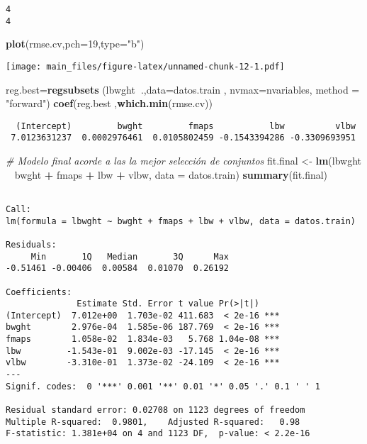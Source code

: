 \documentclass[]{article}
\newenvironment{Shaded}{\begin{snugshade}}{\end{snugshade}}
\newcommand{\KeywordTok}[1]{\textcolor[rgb]{0.13,0.29,0.53}{\textbf{#1}}}
\newcommand{\DataTypeTok}[1]{\textcolor[rgb]{0.13,0.29,0.53}{#1}}
\newcommand{\DecValTok}[1]{\textcolor[rgb]{0.00,0.00,0.81}{#1}}
\newcommand{\StringTok}[1]{\textcolor[rgb]{0.31,0.60,0.02}{#1}}
\newcommand{\CommentTok}[1]{\textcolor[rgb]{0.56,0.35,0.01}{\textit{#1}}}
\newcommand{\OperatorTok}[1]{\textcolor[rgb]{0.81,0.36,0.00}{\textbf{#1}}}
\newcommand{\NormalTok}[1]{#1}
\begin{document}
\begin{verbatim}
4 
4 
\end{verbatim}

\begin{Shaded}
\begin{Highlighting}[]
\KeywordTok{plot}\NormalTok{(rmse.cv,}\DataTypeTok{pch=}\DecValTok{19}\NormalTok{,}\DataTypeTok{type=}\StringTok{"b"}\NormalTok{)}
\end{Highlighting}
\end{Shaded}

\texttt{[image: main\_files/figure-latex/unnamed-chunk-12-1.pdf]}

\begin{Shaded}
\begin{Highlighting}[]
\NormalTok{reg.best=}\KeywordTok{regsubsets}\NormalTok{ (lbwght}\OperatorTok{~}\NormalTok{.,}\DataTypeTok{data=}\NormalTok{datos.train , }\DataTypeTok{nvmax=}\NormalTok{nvariables, }\DataTypeTok{method =} \StringTok{"forward"}\NormalTok{)}
\KeywordTok{coef}\NormalTok{(reg.best ,}\KeywordTok{which.min}\NormalTok{(rmse.cv))}
\end{Highlighting}
\end{Shaded}

\begin{verbatim}
  (Intercept)         bwght         fmaps           lbw          vlbw 
 7.0123631237  0.0002976461  0.0105802459 -0.1543394286 -0.3309693951 
\end{verbatim}

\begin{Shaded}
\begin{Highlighting}[]
\CommentTok{# Modelo final acorde a las la mejor selección de conjuntos}
\NormalTok{fit.final <-}\StringTok{ }\KeywordTok{lm}\NormalTok{(lbwght }\OperatorTok{~}\StringTok{ }\NormalTok{bwght }\OperatorTok{+}\StringTok{ }\NormalTok{fmaps }\OperatorTok{+}\StringTok{ }\NormalTok{lbw }\OperatorTok{+}\StringTok{ }\NormalTok{vlbw, }\DataTypeTok{data =}\NormalTok{ datos.train)}
\KeywordTok{summary}\NormalTok{(fit.final)}
\end{Highlighting}
\end{Shaded}

\begin{verbatim}

Call:
lm(formula = lbwght ~ bwght + fmaps + lbw + vlbw, data = datos.train)

Residuals:
     Min       1Q   Median       3Q      Max 
-0.51461 -0.00406  0.00584  0.01070  0.26192 

Coefficients:
              Estimate Std. Error t value Pr(>|t|)    
(Intercept)  7.012e+00  1.703e-02 411.683  < 2e-16 ***
bwght        2.976e-04  1.585e-06 187.769  < 2e-16 ***
fmaps        1.058e-02  1.834e-03   5.768 1.04e-08 ***
lbw         -1.543e-01  9.002e-03 -17.145  < 2e-16 ***
vlbw        -3.310e-01  1.373e-02 -24.109  < 2e-16 ***
---
Signif. codes:  0 '***' 0.001 '**' 0.01 '*' 0.05 '.' 0.1 ' ' 1

Residual standard error: 0.02708 on 1123 degrees of freedom
Multiple R-squared:  0.9801,    Adjusted R-squared:   0.98 
F-statistic: 1.381e+04 on 4 and 1123 DF,  p-value: < 2.2e-16
\end{verbatim}
\end{document}

